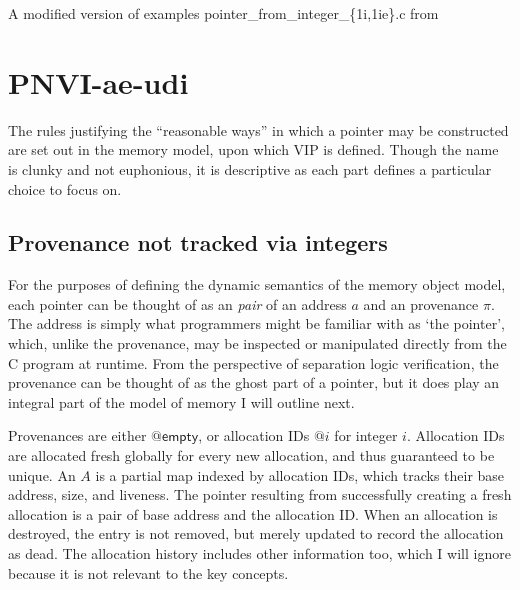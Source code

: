 \begin{marginfigure}
    \raggedright%
    \caption{A modified version of examples
        pointer\_from\_integer\_\{1i,1ie\}.c
        from~\textcite{memarian2019exploring}}\label{fig:mem-model-ptr-from-int}
\end{marginfigure}%

\section{PNVI-ae-udi}

The rules justifying the ``reasonable ways'' in which a pointer may be
constructed are set out in the  memory model, upon which VIP is
defined. Though the name is clunky and not euphonious, it is descriptive as each
part defines a particular choice to focus on.

\subsection{Provenance not tracked via integers}

For the purposes of defining the dynamic semantics of the memory object model,
each pointer can be thought of as an \emph{pair} of an address $a$ and an
provenance $\pi$. The address is simply what programmers might be familiar
with as `the pointer', which, unlike the provenance, may be inspected or
manipulated directly from the C program at runtime. From the perspective of
separation logic verification, the provenance can be thought of as the ghost
part of a pointer, but it does play an integral part of the model of memory I
will outline next.

Provenances are either $@\mathsf{empty}$, or allocation IDs $@i$ for integer
$i$. Allocation IDs are allocated fresh
globally for every new
allocation, and thus guaranteed to be unique. An 
$\mathit{A}$ is a partial map indexed by allocation IDs, which tracks their
base address, size, and liveness. The pointer
resulting from successfully creating a fresh allocation is a pair of base
address and the allocation ID\@. When an allocation is destroyed, the entry is
not removed, but merely updated to record the allocation as dead. The
allocation history includes other information too, which I will ignore because
it is not relevant to the key concepts.

